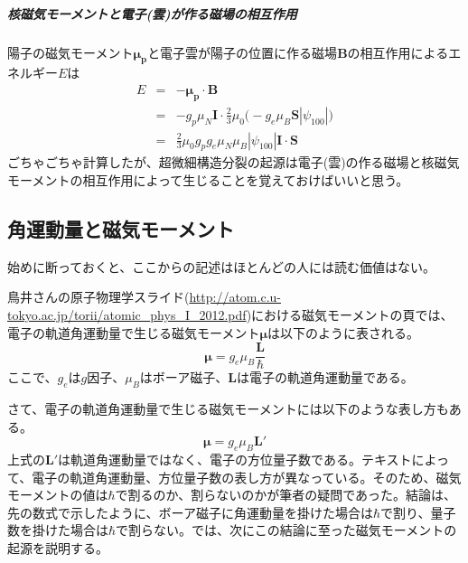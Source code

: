 \documentclass[11pt,a4paper]{jsarticle}
\begin{document}
\subparagraph{核磁気モーメントと電子(雲)が作る磁場の相互作用}
陽子の磁気モーメント$\bm{\mu_p}$と電子雲が陽子の位置に作る磁場$\bm{B}$の相互作用によるエネルギー$E$は
\begin{eqnarray}
  E &=& - \bm{\mu_p} \cdot \bm{B}\\
  &=& - g_p \mu_N \bm{I} \cdot \frac{2}{3}\mu_0 \bigl(-g_e \mu_B \bm{S} |\psi_{100}| \bigr)\\
  &=& \frac{2}{3}\mu_0 g_p g_e \mu_N \mu_B |\psi_{100}| \bm{I} \cdot \bm{S}
\end{eqnarray}
ごちゃごちゃ計算したが、超微細構造分裂の起源は電子(雲)の作る磁場と核磁気モーメントの相互作用によって生じることを覚えておけばいいと思う。

\begin{boxnote}
  \subsection*{角運動量と磁気モーメント}

  始めに断っておくと、ここからの記述はほとんどの人には読む価値はない。

  鳥井さんの原子物理学スライド(\url{http://atom.c.u-tokyo.ac.jp/torii/atomic_phys_I_2012.pdf})における磁気モーメントの頁では、
  電子の軌道角運動量で生じる磁気モーメント$\bm{\mu}$は以下のように表される。
  \begin{equation}
    \bm{\mu} = g_e \mu_B \frac{\bm{L}}{\hbar}
  \end{equation}
  ここで、$g_e$は$g$因子、$\mu_B$はボーア磁子、$\bm{L}$は電子の軌道角運動量である。

  さて、電子の軌道角運動量で生じる磁気モーメントには以下のような表し方もある。
  \begin{equation}
    \bm{\mu} = g_e \mu_B \bm{L'}
  \end{equation}
  上式の$\bm{L'}$は軌道角運動量ではなく、電子の方位量子数である。テキストによって、電子の軌道角運動量、方位量子数の表し方が異なっている。そのため、磁気モーメントの値は$\hbar$で割るのか、割らないのかが筆者の疑問であった。結論は、先の数式で示したように、ボーア磁子に角運動量を掛けた場合は$\hbar$で割り、量子数を掛けた場合は$\hbar$で割らない。では、次にこの結論に至った磁気モーメントの起源を説明する。


\end{boxnote}
\end{document}
